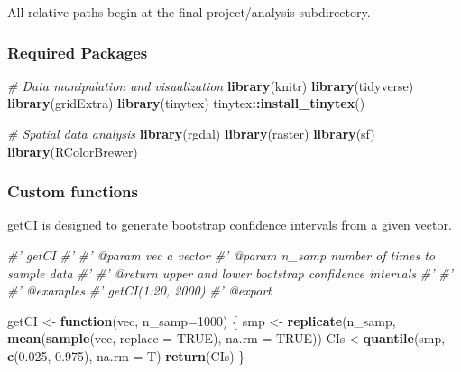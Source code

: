 \documentclass[]{article}
\newenvironment{Shaded}{\begin{snugshade}}{\end{snugshade}}
\newcommand{\CommentTok}[1]{\textcolor[rgb]{0.56,0.35,0.01}{\textit{#1}}}
\newcommand{\ControlFlowTok}[1]{\textcolor[rgb]{0.13,0.29,0.53}{\textbf{#1}}}
\newcommand{\DataTypeTok}[1]{\textcolor[rgb]{0.13,0.29,0.53}{#1}}
\newcommand{\DecValTok}[1]{\textcolor[rgb]{0.00,0.00,0.81}{#1}}
\newcommand{\FloatTok}[1]{\textcolor[rgb]{0.00,0.00,0.81}{#1}}
\newcommand{\KeywordTok}[1]{\textcolor[rgb]{0.13,0.29,0.53}{\textbf{#1}}}
\newcommand{\NormalTok}[1]{#1}
\newcommand{\OperatorTok}[1]{\textcolor[rgb]{0.81,0.36,0.00}{\textbf{#1}}}
\newcommand{\OtherTok}[1]{\textcolor[rgb]{0.56,0.35,0.01}{#1}}
\newcommand{\StringTok}[1]{\textcolor[rgb]{0.31,0.60,0.02}{#1}}
\begin{document}
All relative paths begin at the final-project/analysis subdirectory.

\hypertarget{required-packages}{%
\subsubsection{Required Packages}\label{required-packages}}

\begin{Shaded}
\end{Shaded}

\begin{Shaded}
\begin{Highlighting}[]
\CommentTok{# Data manipulation and visualization}
\KeywordTok{library}\NormalTok{(knitr)}
\KeywordTok{library}\NormalTok{(tidyverse)}
\KeywordTok{library}\NormalTok{(gridExtra)}
\KeywordTok{library}\NormalTok{(tinytex)}
\NormalTok{tinytex}\OperatorTok{::}\KeywordTok{install_tinytex}\NormalTok{()}

\CommentTok{# Spatial data analysis}
\KeywordTok{library}\NormalTok{(rgdal)}
\KeywordTok{library}\NormalTok{(raster)}
\KeywordTok{library}\NormalTok{(sf)}
\KeywordTok{library}\NormalTok{(RColorBrewer)}
\end{Highlighting}
\end{Shaded}

\hypertarget{custom-functions}{%
\subsubsection{Custom functions}\label{custom-functions}}

getCI is designed to generate bootstrap confidence intervals from a
given vector.

\begin{Shaded}
\begin{Highlighting}[]
\CommentTok{#' getCI}
\CommentTok{#' }
\CommentTok{#' @param vec a vector}
\CommentTok{#' @param n_samp number of times to sample data}
\CommentTok{#'}
\CommentTok{#' @return upper and lower bootstrap confidence intervals}
\CommentTok{#' }
\CommentTok{#'}
\CommentTok{#' @examples}
\CommentTok{#'    getCI(1:20, 2000)}
\CommentTok{#' @export}

\NormalTok{getCI <-}\StringTok{ }\ControlFlowTok{function}\NormalTok{(vec, }\DataTypeTok{n_samp=}\DecValTok{1000}\NormalTok{) \{}
\NormalTok{  smp <-}\StringTok{ }\KeywordTok{replicate}\NormalTok{(n_samp, }\KeywordTok{mean}\NormalTok{(}\KeywordTok{sample}\NormalTok{(vec, }\DataTypeTok{replace =} \OtherTok{TRUE}\NormalTok{), }\DataTypeTok{na.rm =} \OtherTok{TRUE}\NormalTok{))}
\NormalTok{  CIs <-}\KeywordTok{quantile}\NormalTok{(smp, }\KeywordTok{c}\NormalTok{(}\FloatTok{0.025}\NormalTok{, }\FloatTok{0.975}\NormalTok{), }\DataTypeTok{na.rm =}\NormalTok{ T)}
  \KeywordTok{return}\NormalTok{(CIs)}
\NormalTok{\}}
\end{Highlighting}
\end{Shaded}
\end{document}
